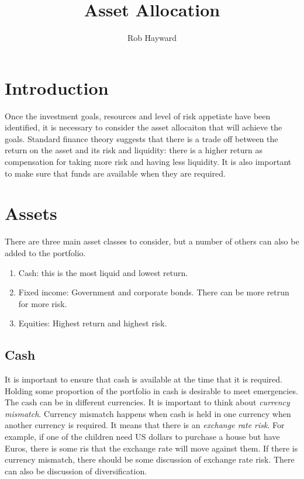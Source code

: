\documentclass[12pt, a4paper, oneside]{article}\usepackage{graphicx, color}
\begin{document}
\title{Asset Allocation}
\author{Rob Hayward}
\maketitle
\section{Introduction}
Once the investment goals, resources and level of risk appetiate have been identified, it is necessary to consider the asset allocaiton that will achieve the goals.  Standard finance theory suggests that there is a trade off between the return on the asset and its risk and liquidity:  there is a higher return as compensation for taking more risk and having less liquidity.  It is also important to make sure that funds are available when they are required.  

\section{Assets}
There are three main asset classes to consider, but a number of others can also be added to the portfolio. 
\begin{enumerate}
\item Cash:  this is the most liquid and lowest return.  
\item Fixed income:  Government and corporate bonds.  There can be more retrun for more risk. 
\item Equities:  Highest return and highest risk.  
\end{enumerate}

\subsection{Cash}
It is important to ensure that cash is available at the time that it is required.  Holding some proportion of the portfolio in cash is desirable to meet emergencies.  The cash can be in different currencies. It is important to think about \emph{currency mismatch}.  Currency mismatch happens when cash is held in one currency when another currency is required.  It means that there is an \emph{exchange rate risk}.  For example, if one of the children need US dollars to purchase a house but have Euros, there is some ris that the exchange rate will move against them.  If there is currency mismatch, there should be some discussion of exchange rate risk.  There can also be discussion of diversification. 
\end{document}
